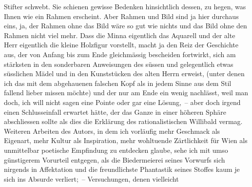 \begin{ledgroupsized}[t]{13cm}
                        Stifter schwebt. Sie schienen gewisse
                    Bedenken hinsichtlich dessen, zu hegen, was Ihnen wie ein Rahmen erscheint. Aber
                    Rahmen und Bild sind ja hier durchaus eins, ja, der Rahmen ohne das Bild wäre so
                    gut wie nichts und das Bild ohne den Rahmen nicht viel mehr. Dass die Minna eigentlich das
                    Aquarell und der alte Herr eigentlich die kleine Holzfigur vorstellt, macht ja
                    den Reiz der Geschichte aus, der von Anfang bis zum Ende gleichmässig bescheiden
                    fortwirkt, sich am stärksten in den sonderbaren Anweisungen des süssen und
                    gelegentlich etwas süsslichen Mädel und in den Kunststücken des alten {\pb}Herrn erweist, (unter denen ich das mit dem
                    abgehauenen falschen Kopf als in jedem Sinne aus dem Stil fallend lieber missen
                    möchte) und der nur am Ende ein wenig nachlässt, weil man doch, ich will nicht
                    sagen eine Pointe oder gar eine Lösung, – aber doch irgend einen Schlusseinfall
                    erwartet hätte, der das Ganze in einer höheren Sphäre abschliessen sollte als
                    dies die Erklärung des rationalistischen Willibald vermag. Weiteren Arbeiten des Autors, in dem ich
                    vorläufig mehr Geschmack als Eigenart, mehr Kultur als Inspiration, mehr
                    wohltuende Zärtlichkeit für Wien als unmittelbar
                    poetische Empfindung zu entdecken glaube, sehe ich mit umso günstigerem
                    Vorurteil entgegen, als die Biedermeierei seines Vorwurfs \introOben{}sich\introOben{} nirgends in Affektation und die freundlichste Phantastik seines
                    Stoffes kaum je sich ins Absurde verliert; – Versuchungen, denen vielleicht

\end{ledgroupsized}
